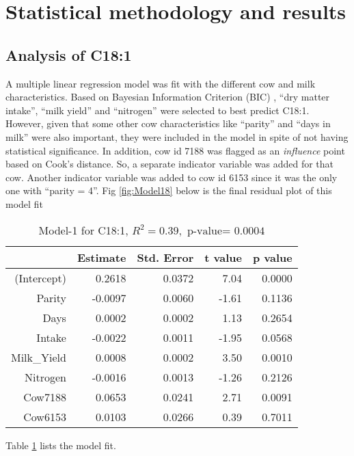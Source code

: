 \section*{Statistical methodology and results} \label{Sec_Methods}

\subsection*{Analysis of C18:1}
A multiple linear regression model was fit with the different cow and milk characteristics. Based on Bayesian Information Criterion (BIC) \cite{Schwarz_etal_1978_BIC}, ``dry matter intake'', ``milk yield'' and ``nitrogen'' were selected to best predict C18:1. However, given that some other cow characteristics like ``parity'' and ``days in milk'' were also important, they were included in the model in spite of not having statistical significance. In addition, cow id 7188 was flagged as an {\emph{influence}} point \cite{Chatterjee_Hadi_1986_SS} based on Cook's distance. So, a separate indicator variable was added for that cow. Another indicator variable was added to cow id 6153 since it was the only one with ``parity = 4''. Fig \ref{fig:Model18} below is the final residual plot of this model fit
\begin{table}[H]
\centering
\begin{tabular}{rrrrr}
  \hline
 & Estimate & Std. Error & t value & p value \\ 
  \hline
(Intercept) & 0.2618 & 0.0372 & 7.04 & 0.0000 \\ 
  Parity & -0.0097 & 0.0060 & -1.61 & 0.1136 \\ 
  Days & 0.0002 & 0.0002 & 1.13 & 0.2654 \\ 
  Intake & -0.0022 & 0.0011 & -1.95 & 0.0568 \\ 
  Milk\_Yield & 0.0008 & 0.0002 & 3.50 & 0.0010 \\ 
  Nitrogen & -0.0016 & 0.0013 & -1.26 & 0.2126 \\ 
  Cow7188 & 0.0653 & 0.0241 & 2.71 & 0.0091 \\ 
  Cow6153 & 0.0103 & 0.0266 & 0.39 & 0.7011 \\ 
   \hline
\end{tabular}
\caption{Model-1 for C18:1, $R^2 = 0.39, \text{ p-value= } 0.0004$}
\label{Tab:Model18}
\end{table}
Table \ref{Tab:Model18} lists the model fit. 

